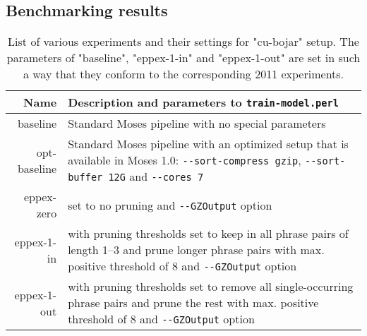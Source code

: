 \subsection{Benchmarking results}

\begin{table}[ht]
\centering
\begin{tabular}{ r p{10cm} }
Name & Description and parameters to \verb|train-model.perl| \\
\hline
\hline
baseline & Standard Moses pipeline with no special parameters \\
opt-baseline & Standard Moses pipeline with an optimized setup that is
available in Moses 1.0:
\verb|--sort-compress gzip|, \verb|--sort-buffer 12G| and \verb|--cores 7| \\
eppex-zero & \eppex{} set to no pruning and \verb|--GZOutput| option \\
eppex-1-in & \eppex{} with pruning thresholds set to keep in
all phrase pairs of length 1--3 and prune longer phrase pairs
with max. positive threshold of 8 and \verb|--GZOutput| option \\
eppex-1-out & \eppex{} with pruning thresholds set to remove
all single-occurring phrase pairs and prune the rest with
max. positive threshold of 8 and \verb|--GZOutput| option \\
\hline
\hline
\end{tabular}
\caption{\label{cu-bojar-scenarios}List of various experiments and their
settings for "cu-bojar" setup. The parameters of "baseline", "eppex-1-in"
and "eppex-1-out" are set in such a way that they conform to the
corresponding 2011 experiments.}
\end{table}



